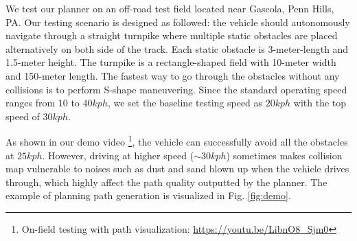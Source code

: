 \documentclass[../thesis.tex]{subfiles}
\begin{document}
We test our planner on an off-road test field located near Gascola, Penn Hills, PA.
Our testing scenario is designed as followed: the vehicle should autonomously navigate through a straight turnpike where multiple static obstacles are placed alternatively on both side of the track.
Each static obstacle is 3-meter-length and 1.5-meter height.
The turnpike is a rectangle-shaped field with 10-meter width and 150-meter length.
The fastest way to go through the obstacles without any collisions is to perform S-shape maneuvering.
Since the standard operating speed ranges from $10$ to $40 kph$, we set the baseline testing speed as $20 kph$ with the top speed of $30 kph$.
 
As shown in our demo video
\footnote{On-field testing with path visualization: \url{https://youtu.be/LibnO8_Sjm0}},
the vehicle can successfully avoid all the obstacles at $25 kph$.
However, driving at higher speed ($\sim 30kph$) sometimes makes collision map vulnerable to noises such as dust and sand blown up when the vehicle drives through, which highly affect the path quality outputted by the planner.
The example of planning path generation is visualized in Fig. \ref{fig:demo}.
 
 
\end{document}
